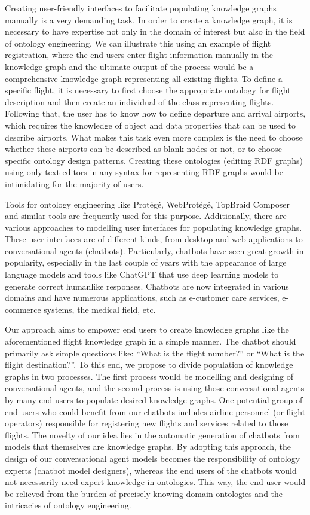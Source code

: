 \documentclass[runningheads]{llncs}
\begin{document}
Creating user-friendly interfaces to facilitate populating knowledge graphs manually is a very demanding task. In order to create a knowledge graph, it is necessary to have expertise not only in the domain of interest but also in the field of ontology engineering. We can illustrate this using an example of flight registration, where the end-users enter flight information manually in the knowledge graph and  the ultimate output of the process would be a comprehensive knowledge graph representing all existing flights. To define a specific flight, it is necessary to first choose the appropriate ontology for flight description and then create an individual of the class representing flights. Following that, the user has to know how to define departure and arrival airports, which requires the knowledge of object and data properties that can be used to describe airports. What makes this task even more complex is the need to choose whether these airports can be described as blank nodes or not, or to choose specific ontology design patterns. Creating these ontologies (editing RDF graphs) using only text editors in any syntax for representing RDF graphs would be intimidating for the majority of users.

Tools for ontology engineering like Protégé, WebProtégé, TopBraid Composer and similar tools are frequently used for this purpose. Additionally, there are various approaches to modelling user interfaces for populating knowledge graphs. These user interfaces are of different kinds, from desktop and web applications to conversational agents (chatbots). Particularly, chatbots have seen great growth in popularity, especially in the last couple of years with the appearance of large language models and tools like ChatGPT that use deep learning models to generate correct humanlike responses. Chatbots are now integrated in various domains and have numerous applications, such as e-customer care services, e-commerce systems, the medical field, etc.

Our approach aims to empower end users to create knowledge graphs like the aforementioned flight knowledge graph in a simple manner. The chatbot should primarily ask simple questions like: ``What is the flight number?'' or ``What is the flight destination?''. To this end, we propose to divide population of knowledge graphs in two processes. The first process would be modelling and designing of conversational agents, and the second process is using those conversational agents by many end users to populate desired knowledge graphs. One potential group of end users who could benefit from our chatbots includes airline personnel (or flight operators) responsible for registering new flights and services related to those flights. The novelty of our idea lies in the automatic generation of chatbots from models that themselves are knowledge graphs. By adopting this approach, the design of our conversational agent models becomes the responsibility of ontology experts (chatbot model designers), whereas the end users of the chatbots would not necessarily need expert knowledge in ontologies. This way, the end user would be relieved from the burden of precisely knowing domain ontologies and the intricacies of ontology engineering.
\end{document}
